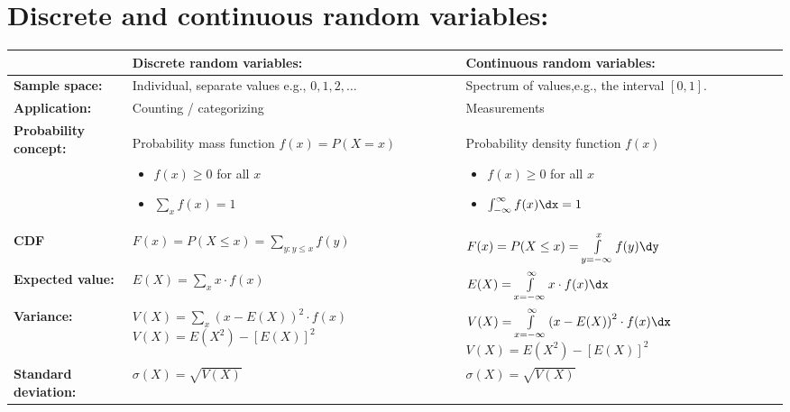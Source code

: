 \documentclass[11pt,a4paper,english]{article} %
\begin{document}
\section*{Discrete and continuous random variables:}
\begin{center}
    \renewcommand{\arraystretch}{1.8}
    \begin{tabular}{m{}m{}m{}}
        \toprule
                                                    & \textbf{Discrete random variables:}                           & \textbf{Continuous random variables:} \\ 
        \midrule
            \textbf{Sample \newline space:}         & Individual, separate values \newline e.g., $0, 1, 2, \ldots$  & Spectrum of values,\newline e.g., the interval $[0, 1]$.\\
            \textbf{Application:}                   & Counting / categorizing                                       & Measurements \\
            \textbf{Probability \newline concept:}  & Probability mass function $f(x) = P(X=x)$ \newline \begin{itemize} \item $f(x) \geq 0$ for all $x$ \item $\sum_{x} f(x) = 1$ \end{itemize} & Probability density function $f(x)$ \newline \begin{itemize} \item $f(x) \geq 0$ for all $x$ \item $\int_{-\infty}^{\infty} f(x) \dx = 1$ \end{itemize} \\
            \textbf{CDF}                            & $F(x) = P(X \le x) = \sum\limits_{y: y \le x} f(y)$           & $F(x) = P(X \le x) = \int\limits_{y=-\infty}^{x} f(y)\dy$ \\
            \textbf{Expected \newline value:}       & $E(X) = \sum\limits_{x} x \cdot f(x)$                         & $E(X) = \int\limits_{x=-\infty}^{\infty} x \cdot f(x)\dx$\\
            \textbf{Variance:}                      & $V(X) = \sum\limits_{x} \left(x - E(X)\right)^2 \cdot f(x)$ \newline $V(X) = E(X^2) - \left[E(X)\right]^2$ & $V(X) = \int\limits_{x=-\infty}^{\infty} \left(x - E(X)\right)^2 \cdot f(x) \dx$ \newline $V(X) = E(X^2) - \left[E(X)\right]^2$ \\
            \textbf{Standard deviation:}            & $\sigma(X) = \sqrt{V(X)}$                                     & $\sigma(X) = \sqrt{V(X)}$ \\
        \bottomrule
    \end{tabular}
\end{center}
\end{document}
